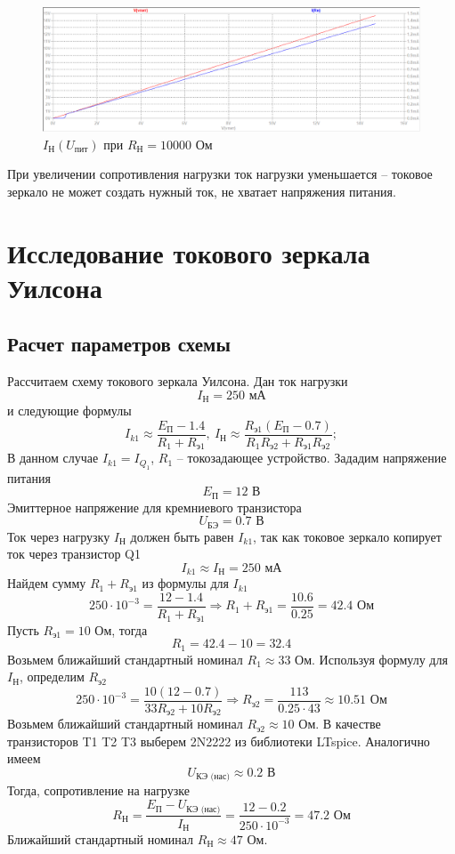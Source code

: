 \documentclass[a4paper, 12pt]{article}
\begin{document}
    \begin{figure}[H]
        \centering
        \includegraphics[scale=0.46]{1task_Iн(Vпит)_Rн10000.png}
        \captionsetup{skip=0pt}
        \caption{$I_\text{Н}\left( U_\text{пит} \right)$ при $R_\text{Н}=10000$ Ом}
        \label{fig:1task_InVlR10000}
    \end{figure}
    \noindent При увеличении сопротивления нагрузки ток нагрузки уменьшается -- токовое зеркало не может создать нужный ток,
    не хватает напряжения питания.


    \section{Исследование токового зеркала Уилсона}
    \subsection{Расчет параметров схемы}
    Рассчитаем схему токового зеркала Уилсона. Дан ток нагрузки
    $$
    I_\text{Н}=250\text{ мА}
    $$
    и следующие формулы
    $$
    I_{k1}\approx\dfrac{E_\text{П}-1.4}{R_1+R_\text{э1}},\ I_\text{Н}\approx\dfrac{R_\text{э1}\left( E_\text{П}-0.7 \right)}{R_1R_\text{э2}+R_\text{э1}R_\text{э2}};
    $$
    В данном случае $I_{k1}=I_{Q_1}$, $R_1$ -- токозадающее устройство. Зададим напряжение питания $$E_\text{П}=12\text{ В}$$
    Эмиттерное напряжение для кремниевого транзистора
    $$
    U_\text{БЭ}=0.7\text{ В}
    $$
    Ток через нагрузку $I_\text{Н}$ должен быть равен $I_{k1}$, так как токовое зеркало копирует ток через транзистор Q1
    $$
    I_{k1}\approx I_\text{Н}=250\text{ мА}
    $$
    Найдем сумму $R_1+R_\text{э1}$ из формулы для $I_{k1}$
    $$
    250\cdot10^{-3}=\dfrac{12-1.4}{R_1+R_\text{э1}}\Rightarrow R_1+R_\text{э1}=\dfrac{10.6}{0.25}=42.4\text{ Ом}
    $$
    Пусть $R_\text{э1}=10$ Ом, тогда
    $$
    R_1=42.4-10=32.4
    $$
    Возьмем ближайший стандартный номинал $R_1\approx33$ Ом. Используя формулу для $I_\text{Н}$,
    определим $R_\text{э2}$
    $$
    250\cdot10^{-3}=\dfrac{10\left( 12-0.7 \right)}{33R_\text{э2}+10R_\text{э2}}\Rightarrow R_\text{э2}=\dfrac{113}{0.25\cdot43}\approx10.51\text{ Ом}
    $$
    Возьмем ближайший стандартный номинал $R_\text{э2}\approx10$ Ом. В качестве транзисторов T1 T2 T3 выберем 2N2222
    из библиотеки LTspice. Аналогично имеем
    $$
    U_\text{КЭ (нас)}\approx0.2\text{ В}
    $$
    Тогда, сопротивление на нагрузке
    $$
    R_\text{Н}=\dfrac{E_\text{П}-U_\text{КЭ (нас)}}{I_\text{Н}}=\dfrac{12-0.2}{250\cdot10^{-3}}=47.2\text{ Ом}
    $$
    Ближайший стандартный номинал $R_\text{Н}\approx47$ Ом.
\end{document}
